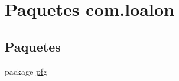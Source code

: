 \hypertarget{namespacecom_1_1loalon}{}\section{Paquetes com.\+loalon}
\label{namespacecom_1_1loalon}
\subsection*{Paquetes}
\begin{DoxyCompactItemize}
\item 
package \mbox{\hyperlink{namespacecom_1_1loalon_1_1pfg}{pfg}}
\end{DoxyCompactItemize}
